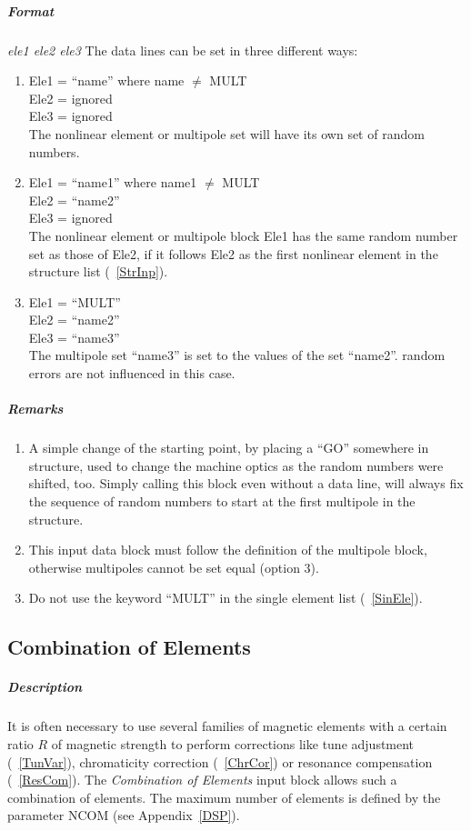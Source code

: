 \documentclass[a4paper,11pt]{report}
\begin{document}
\subparagraph{Format} {\em ele1 ele2 ele3} \/The data lines can be set
in three different ways:
\begin{enumerate}
\item Ele1 = ``name'' where name $\ne$ MULT \\
  Ele2 = ignored \\
  Ele3 = ignored \\
  The nonlinear element or multipole set will have its own set of
  random numbers.
\item Ele1 = ``name1'' where name1 $\ne$ MULT \\
  Ele2 = ``name2'' \\
  Ele3 = ignored \\
  The nonlinear element or multipole block Ele1 has the same random
  number set as those of Ele2, if it follows Ele2 as the first
  nonlinear element in the structure list (~\ref{StrInp}).
\item Ele1 = ``MULT'' \\
  Ele2 = ``name2'' \\
  Ele3 = ``name3'' \\
  The multipole set ``name3'' is set to the values of the set
  ``name2''. random errors are not influenced in this case.
\end{enumerate}

\subparagraph{Remarks}
\begin{enumerate}
\item A simple change of the starting point, by placing a ``GO''
  somewhere in structure, used to change the machine optics as the
  random numbers were shifted, too.  Simply calling this block even
  without a data line, will always fix the sequence of random numbers
  to start at the first multipole in the structure.
\item This input data block must follow the definition of the
  multipole block, otherwise multipoles cannot be set equal (option
  3).
\item Do not use the keyword ``MULT'' in the single element list
  (~\ref{SinEle}).
\end{enumerate}

\subsection{Combination of Elements} \label{ComEle}

\subparagraph{Description} It is often necessary to use several
families of magnetic elements with a certain ratio $ R $ of magnetic
strength to perform corrections like tune adjustment (~\ref{TunVar}),
chromaticity correction (~\ref{ChrCor}) or resonance compensation
(~\ref{ResCom}).  The {\em Combination of Elements} \/input block
allows such a combination of elements.  The maximum number of elements
is defined by the parameter NCOM (see Appendix~\ref{DSP}).
\end{document}
